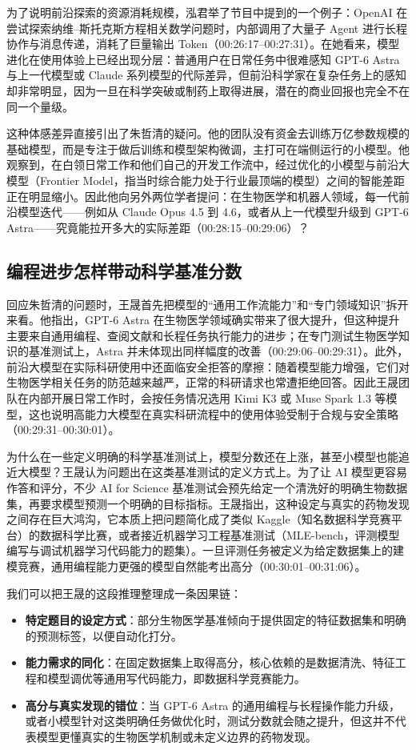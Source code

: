 \documentclass[UTF8,a4paper,11pt,fontset=fandol]{ctexart}
\begin{document}
为了说明前沿探索的资源消耗规模，泓君举了节目中提到的一个例子：OpenAI 在尝试探索纳维–斯托克斯方程相关数学问题时，内部调用了大量子 Agent 进行长程协作与消息传递，消耗了巨量输出 Token（00:26:17–00:27:31）。在她看来，模型进化在使用体验上已经出现分层：普通用户在日常任务中很难感知 GPT-6 Astra 与上一代模型或 Claude 系列模型的代际差异，但前沿科学家在复杂任务上的感知却非常明显，因为一旦在科学突破或制药上取得进展，潜在的商业回报也完全不在同一个量级。

这种体感差异直接引出了朱哲清的疑问。他的团队没有资金去训练万亿参数规模的基础模型，而是专注于做后训练和模型架构微调，主打可在端侧运行的小模型。他观察到，在白领日常工作和他们自己的开发工作流中，经过优化的小模型与前沿大模型（Frontier Model，指当时综合能力处于行业最顶端的模型）之间的智能差距正在明显缩小。因此他向另外两位学者提问：在生物医学和机器人领域，每一代前沿模型迭代——例如从 Claude Opus 4.5 到 4.6，或者从上一代模型升级到 GPT-6 Astra——究竟能拉开多大的实际差距（00:28:15–00:29:06）？

\subsection{编程进步怎样带动科学基准分数}
回应朱哲清的问题时，王晟首先把模型的“通用工作流能力”和“专门领域知识”拆开来看。他指出，GPT-6 Astra 在生物医学领域确实带来了很大提升，但这种提升主要来自通用编程、查阅文献和长程任务执行能力的进步；在专门测试生物医学知识的基准测试上，Astra 并未体现出同样幅度的改善（00:29:06–00:29:31）。此外，前沿大模型在实际科研使用中还面临安全拒答的摩擦：随着模型能力增强，它们对生物医学相关任务的防范越来越严，正常的科研请求也常遭拒绝回答。因此王晟团队在内部开展日常工作时，会按任务情况选用 Kimi K3 或 Muse Spark 1.3 等模型，这也说明高能力大模型在真实科研流程中的使用体验受制于合规与安全策略（00:29:31–00:30:01）。

为什么在一些定义明确的科学基准测试上，模型分数还在上涨，甚至小模型也能追近大模型？王晟认为问题出在这类基准测试的定义方式上。为了让 AI 模型更容易作答和评分，不少 AI for Science 基准测试会预先给定一个清洗好的明确生物数据集，再要求模型预测一个明确的目标指标。王晟指出，这种设定与真实的药物发现之间存在巨大鸿沟，它本质上把问题简化成了类似 Kaggle（知名数据科学竞赛平台）的数据科学比赛，或者接近机器学习工程基准测试（MLE-bench，评测模型编写与调试机器学习代码能力的题集）。一旦评测任务被定义为给定数据集上的建模竞赛，通用编程能力更强的模型自然能考出高分（00:30:01–00:31:06）。

我们可以把王晟的这段推理整理成一条因果链：
\begin{itemize}
\item \textbf{特定题目的设定方式}：部分生物医学基准倾向于提供固定的特征数据集和明确的预测标签，以便自动化打分。
\item \textbf{能力需求的同化}：在固定数据集上取得高分，核心依赖的是数据清洗、特征工程和模型调优等通用写代码能力，即数据科学竞赛能力。
\item \textbf{高分与真实发现的错位}：当 GPT-6 Astra 的通用编程与长程操作能力升级，或者小模型针对这类明确任务做优化时，测试分数就会随之提升，但这并不代表模型更懂真实的生物医学机制或未定义边界的药物发现。
\end{itemize}
\end{document}
